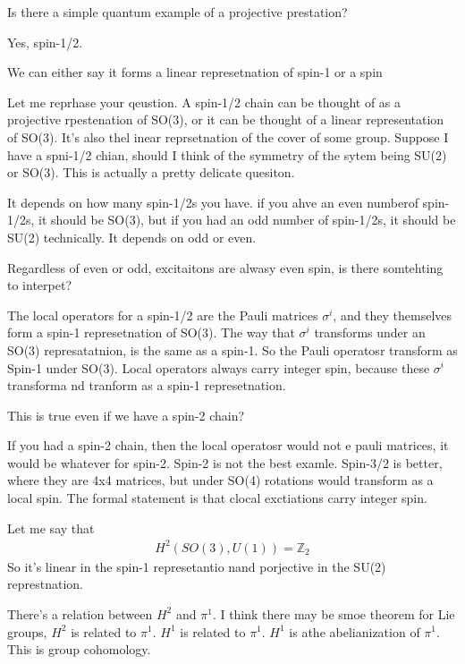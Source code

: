 \begin{question}
    Is there a simple quantum example of a projective prestation?
\end{question}
Yes, spin-1/2.

\begin{question}
    We can either say it forms a linear represetnation of spin-1
    or a spin
\end{question}
Let me reprhase your qeustion.
A spin-1/2 chain can be thought of as a projective rpestenation of SO(3),
or it can be thought of a linear representation of SO(3).
It's also thel inear reprsetnation of the cover of some group.
Suppose I have a spni-1/2 chian,
should I think of the symmetry of the sytem being SU(2) or SO(3).
This is actually a pretty delicate quesiton.

It depends on how many spin-1/2s you have.
if you ahve an even numberof spin-1/2s, it should be SO(3),
but if you had an odd number of spin-1/2s, it should be SU(2) technically.
It depends on odd or even.

\begin{question}
    Regardless of even or odd,
    excitaitons are alwasy even spin,
    is there somtehting to interpet?
\end{question}
The local operators for a spin-1/2 are the Pauli matrices $\sigma^i$,
and they themselves form a spin-1 represetnation of SO(3).
The way that $\sigma^i$ transforms under an SO(3) represatatnion,
is the same as a spin-1.
So the Pauli operatosr transform as Spin-1 under SO(3).
Local operators always carry integer spin,
because these $\sigma^i$ transforma nd tranform as a spin-1 represetnation.

\begin{question}
    This is true even if we have a spin-2 chain?
\end{question}
If you had a spin-2 chain,
then the local operatosr would not e pauli matrices,
it would be whatever for spin-2.
Spin-2 is not the best examle.
Spin-3/2 is better,
where they are 4x4 matrices,
but under SO(4) rotations would transform as a local spin.
The formal statement is that clocal exctiations carry integer spin.

Let me say that
\begin{align}
    H^2(SO(3), U(1)) = \mathbb{Z}_2
\end{align}
So it's linear in the spin-1 represetantio nand porjective in the SU(2)
represtnation.

There's a relation between $H^2$ and $\pi^1$.
I think there may be smoe theorem for Lie groups,
$H^2$ is related to $\pi^1$.
$H^1$ is related to $\pi^1$.
$H^1$ is athe abelianization of $\pi^1$.
This is group cohomology.

